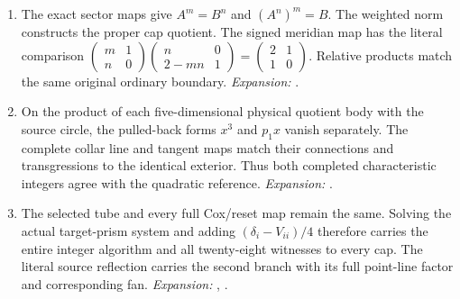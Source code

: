 \begin{enumerate}[label=\arabic*.,leftmargin=*]
\item\hypertarget{step-IV-G-5}{} The exact sector maps give $A^m=B^n$ and
$(A^n)^m=B$. The weighted norm constructs the proper cap quotient.
The signed meridian map has the literal comparison
$\left(\begin{smallmatrix}m&1\\n&0\end{smallmatrix}\right)
\left(\begin{smallmatrix}n&0\\2-mn&1\end{smallmatrix}\right)
=\left(\begin{smallmatrix}2&1\\1&0\end{smallmatrix}\right)$.
Relative products match the same original ordinary boundary.
\textit{Expansion:} .

\item\hypertarget{step-IV-G-6}{} On the product of each five-dimensional physical quotient
body with the source circle, the pulled-back forms $x^3$ and
$p_1x$ vanish separately. The complete collar line and tangent
maps match their connections and transgressions to the identical
exterior. Thus both completed characteristic integers agree
with the quadratic reference.
\textit{Expansion:} .

\item\hypertarget{step-IV-G-7}{} The selected tube and every full Cox/reset map remain the
same. Solving the actual target-prism system and adding
$(\delta_i-V_{ii})/4$ therefore carries the entire integer
algorithm and all twenty-eight witnesses to every cap.
The literal source reflection carries the second branch with
its full point-line factor and corresponding fan.
\textit{Expansion:} , .

\end{enumerate}

